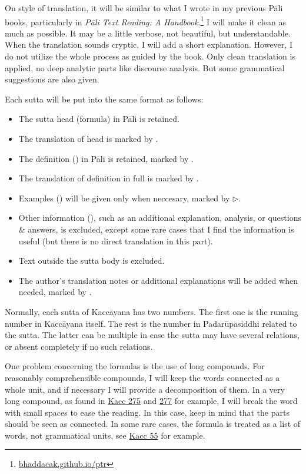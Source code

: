 On style of translation, it will be similar to what I wrote in my previous Pāli books, particularly in \emph{Pāli Text Reading: A Handbook}.\footnote{\url{bhaddacak.github.io/ptr}} I will make it clean as much as possible. It may be a little verbose, not beautiful, but understandable. When the translation sounds cryptic, I will add a short explanation. However, I do not utilize the whole process as guided by the book. Only clean translation is applied, no deep analytic parts like discourse analysis. But some grammatical suggestions are also given.

Each sutta will be put into the same format as follows:

\begin{itemize}
\item The sutta head (formula) in Pāli is retained.
\item The translation of head is marked by \faHeart[regular].
\item The definition () in Pāli is retained, marked by \faAngleRight.
\item The translation of definition in full is marked by \faAngleDoubleRight.
\item Examples () will be given only when neccesary, marked by $\triangleright$.
\item Other information (), such as an additional explanation, analysis, or questions \& answers, is excluded, except some rare cases that I find the information is useful (but there is no direct translation in this part).
\item Text outside the sutta body is excluded.
\item The author's translation notes or additional explanations will be added when needed, marked by \faLightbulb[regular].
\end{itemize}

Normally, each sutta of Kaccāyana has two numbers. The first one is the running number in Kaccāyana itself. The rest is the number in Padarūpasiddhi related to the sutta. The latter can be multiple in case the sutta may have several relations, or absent completely if no such relations.

One problem concerning the formulas is the use of long compounds. For reasonably comprehensible compounds, I will keep the words connected as a whole unit, and if necessary I will provide a decomposition of them. In a very long compound, as found in \hyperref[sut:275]{Kacc 275} and \hyperref[sut:277]{277} for example, I will break the word with small spaces to ease the reading. In this case, keep in mind that the parts should be seen as connected. In some rare cases, the formula is treated as a list of words, not grammatical units, see \hyperref[sut:55]{Kacc 55} for example.
